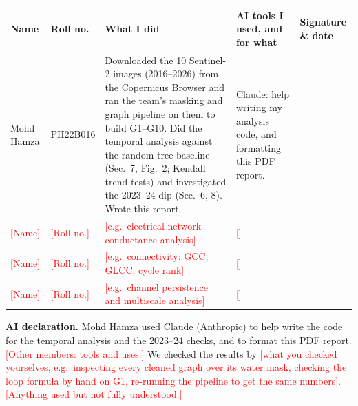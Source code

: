 \documentclass[11pt,a4paper]{article}
\newcommand{\todo}[1]{\textcolor{red}{[#1]}}
\begin{document}
\medskip
\begin{center}\footnotesize
\begin{tabularx}{\textwidth}{@{}p{2.4cm}p{1.8cm}Lp{3.4cm}p{2.4cm}@{}}
\toprule
Name & Roll no. & What I did & AI tools I used, and for what & Signature \& date \\
\midrule
Mohd Hamza & PH22B016 & Downloaded the 10 Sentinel-2 images (2016--2026) from the Copernicus Browser and ran the team's masking and graph pipeline on them to build G1--G10. Did the temporal analysis against the random-tree baseline (Sec.~7, Fig.~2; Kendall trend tests) and investigated the 2023--24 dip (Sec.~6, 8). Wrote this report. & Claude: help writing my analysis code, and formatting this PDF report. & \\[14pt]
\todo{Name} & \todo{Roll no.} & \todo{e.g.\ electrical-network conductance analysis} & \todo{} & \\[14pt]
\todo{Name} & \todo{Roll no.} & \todo{e.g.\ connectivity: GCC, GLCC, cycle rank} & \todo{} & \\[14pt]
\todo{Name} & \todo{Roll no.} & \todo{e.g.\ channel persistence and multiscale analysis} & \todo{} & \\[14pt]
\bottomrule
\end{tabularx}
\end{center}

\textbf{AI declaration.} Mohd Hamza used Claude (Anthropic) to help write the code for the temporal analysis and the 2023--24 checks, and to format this PDF report. \todo{Other members: tools and uses.} We checked the results by \todo{what you checked yourselves, e.g.\ inspecting every cleaned graph over its water mask, checking the loop formula by hand on G1, re-running the pipeline to get the same numbers}. \todo{Anything used but not fully understood.}
\end{document}

